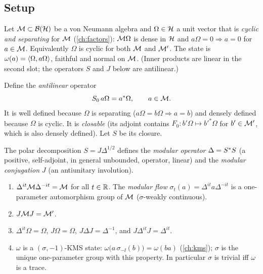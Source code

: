 \subsection{Setup}

Let $\mathcal{M}\subset\mathcal{B}(\mathcal{H})$ be a von Neumann algebra and $\Omega\in\mathcal{H}$ a unit vector that is \emph{cyclic and separating} for $\mathcal{M}$ (\cref{ch:factors}): $\mathcal{M}\Omega$ is dense in $\mathcal{H}$ and $a\Omega=0\Rightarrow a=0$ for $a\in\mathcal{M}$. Equivalently $\Omega$ is cyclic for both $\mathcal{M}$ and $\mathcal{M}'$. The state is $\omega(a)=\langle \Omega,a\Omega\rangle$, faithful and normal on $\mathcal{M}$. (Inner products are linear in the second slot; the operators $S$ and $J$ below are antilinear.)

Define the \emph{antilinear} operator
\begin{equation}
S_0\,a\Omega=a^{*}\Omega,\qquad a\in\mathcal{M}.
\end{equation}
It is well defined because $\Omega$ is separating ($a\Omega=b\Omega\Rightarrow a=b$) and densely defined because $\Omega$ is cyclic. It is \emph{closable} (its adjoint contains $F_0:b'\Omega\mapsto b'^*\Omega$ for $b'\in\mathcal{M}'$, which is also densely defined). Let $S$ be its closure.

\begin{definition}
The polar decomposition $S=J\Delta^{1/2}$ defines the \emph{modular operator} $\Delta=S^{*} S$ (a positive, self-adjoint, in general unbounded, operator, linear) and the \emph{modular conjugation} $J$ (an antiunitary involution).
\end{definition}

\begin{theorem}\label{thm:TT}
\begin{enumerate}[label=(\alph*)]
\item $\Delta^{it}\mathcal{M}\Delta^{-it}=\mathcal{M}$ for all $t\in\mathbb{R}$. The \emph{modular flow} $\sigma_t(a)=\Delta^{it}a\Delta^{-it}$ is a one-parameter automorphism group of $\mathcal{M}$ ($\sigma$-weakly continuous).
\item $J\mathcal{M} J=\mathcal{M}'$.
\item $\Delta^{it}\Omega=\Omega$, $J\Omega=\Omega$, $J\Delta J=\Delta^{-1}$, and $J\Delta^{it}J=\Delta^{it}$.
\item $\omega$ is a $(\sigma,-1)$-KMS state: $\omega\big(a\,\sigma_{-\ii}(b)\big)=\omega(ba)$ (\cref{ch:kms}); $\sigma$ is the unique one-parameter group with this property. In particular $\sigma$ is trivial iff $\omega$ is a trace.
\end{enumerate}
\end{theorem}

